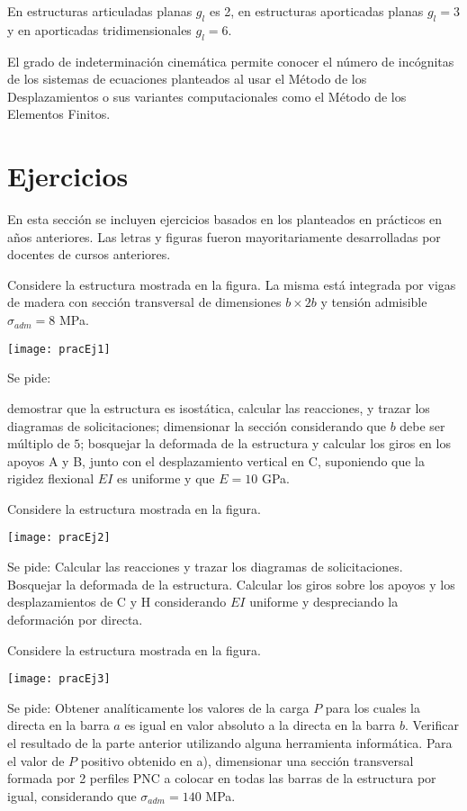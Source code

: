 En estructuras articuladas planas $g_l$ es 2, en estructuras aporticadas planas $g_l=3$ y en aporticadas tridimensionales $g_l=6$.

El grado de indeterminación cinemática permite conocer el número de incógnitas de los sistemas de ecuaciones planteados al usar el Método de los Desplazamientos o sus variantes computacionales como el Método de los Elementos Finitos.









\section{Ejercicios}

En esta sección se incluyen ejercicios basados en los planteados en prácticos en años anteriores. Las letras y figuras fueron mayoritariamente desarrolladas por docentes de cursos anteriores.

\ejercicio
%
Considere la estructura mostrada en la figura. La misma está integrada por vigas de madera con sección transversal de dimensiones $b\times 2b$ y tensión admisible $\sigma_{adm} = 8$ MPa.
%
\begin{center}
\texttt{[image: pracEj1]}
\end{center}
%
\noindent
Se pide:

\parte demostrar que la estructura es isostática, calcular las reacciones, y trazar los diagramas de solicitaciones;
\parte dimensionar la sección considerando que $b$ debe ser múltiplo de $5$;
\parte bosquejar la deformada de la estructura y calcular los giros en los apoyos A y B, junto con el desplazamiento vertical en C, suponiendo que la rigidez flexional $EI$ es uniforme y que $E =10$ GPa.



\ejercicio
%
Considere la estructura mostrada en la figura.
%
\begin{center}
	\texttt{[image: pracEj2]}
\end{center}
%
\noindent
Se pide:
\parte Calcular las reacciones y trazar los diagramas de solicitaciones.
\parte Bosquejar la deformada de la estructura.
\parte Calcular los giros sobre los apoyos y los desplazamientos de C y H considerando $EI$ uniforme y despreciando la deformación por directa.


\ejercicio
%
Considere la estructura mostrada en la figura.
%
\begin{center}
	\texttt{[image: pracEj3]}
\end{center}
%
\noindent
Se pide:
\parte Obtener analíticamente los valores de la carga $P$ para los cuales la directa en la barra $a$ es igual en valor absoluto a la directa en la barra $b$.
\parte Verificar el resultado de la parte anterior utilizando alguna herramienta informática.
\parte Para el valor de $P$ positivo obtenido en a), dimensionar una sección transversal formada por 2 perfiles PNC a colocar en todas las barras de la estructura por igual, considerando que $\sigma_{adm} =140$ MPa.
%
%


